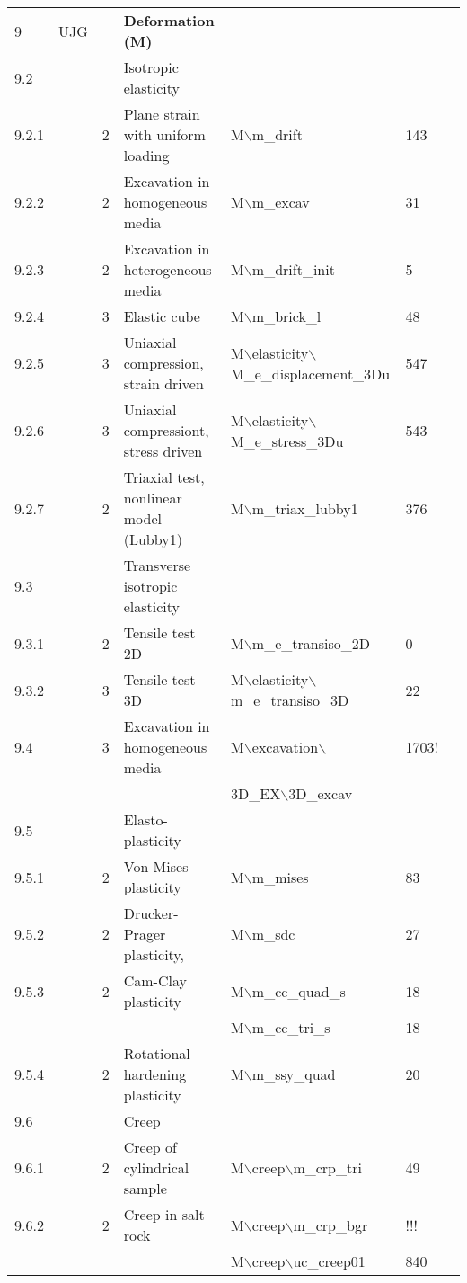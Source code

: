 \begin{landscape}
\begin{center}
\begin{tabularx}{\linewidth}{lllXXll}
9&UJG&&\textbf{Deformation (M)}&&&\\
9.2& && Isotropic elasticity&&&\\
9.2.1&&         2&      Plane strain with uniform loading&      M$\backslash$m\_drift&143&\\
9.2.2&&         2&      Excavation in homogeneous media&        M$\backslash$m\_excav&31&\\
9.2.3&&         2&      Excavation in heterogeneous media&      M$\backslash$m\_drift\_init&5&\\
9.2.4&&   3&    Elastic cube&   M$\backslash$m\_brick\_l&48&\\
9.2.5&&         3&      Uniaxial compression, strain driven&M$\backslash$elasticity$\backslash$M\_e\_displacement\_3Du&547&\\
9.2.6&&         3&      Uniaxial compressiont, stress driven&   M$\backslash$elasticity$\backslash$M\_e\_stress\_3Du&543&\\
9.2.7&&         2&  Triaxial test, nonlinear model (Lubby1)&    M$\backslash$m\_triax\_lubby1&376&\\
9.3  &&    &    Transverse isotropic elasticity&&&\\
9.3.1&&         2&      Tensile test 2D&        M$\backslash$m\_e\_transiso\_2D&0&\\
9.3.2&&         3&      Tensile test 3D&        M$\backslash$elasticity$\backslash$m\_e\_transiso\_3D&22&\\
9.4  &&   3&  Excavation in homogeneous media&M$\backslash$excavation$\backslash$&1703!&\\
&&&                                                                                                                                                                      &3D\_EX$\backslash$3D\_excav&&\\        
9.5  &&    &    Elasto-plasticity&&&\\
9.5.1&&         2&      Von Mises plasticity&   M$\backslash$m\_mises&83&\\      
9.5.2&&         2&      Drucker-Prager plasticity, &    M$\backslash$m\_sdc&27&\\
9.5.3&&         2&      Cam-Clay plasticity&M$\backslash$m\_cc\_quad\_s&18&\\
    &&     &                     &M$\backslash$m\_cc\_tri\_s&18&\\
9.5.4&&         2&      Rotational hardening plasticity&        M$\backslash$m\_ssy\_quad&20&\\
9.6  &&    &    Creep&&&\\
9.6.1&&         2&      Creep of cylindrical sample&    M$\backslash$creep$\backslash$m\_crp\_tri&49&\\
9.6.2&&         2&      Creep in salt rock &    M$\backslash$creep$\backslash$m\_crp\_bgr&!!!&\\
           &&      &                       &    M$\backslash$creep$\backslash$uc\_creep01&840&\\


\end{tabularx}
\end{center}
\end{landscape}
